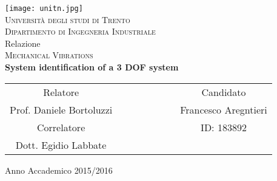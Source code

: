 \begin{titlepage}
 \begin{center}
 \texttt{[image: unitn.jpg]}\\
 \vspace{1em}
 {\Large \textsc{Università degli studi di Trento}}\\
 \vspace{1em}
 {\Large \textsc{Dipartimento di Ingegneria Industriale}}\\
 \vspace{4em}
 {\normalsize Relazione}\\
 \vspace{1em}
 {\Large \textsc{Mechanical Vibrations}}\\
 \vspace{4em}
 {\LARGE\textbf{
 	System identification of a 3 DOF system
 }}\\
 \end{center}

\vskip 2.0cm
 \begin{center}
 \begin{tabular}{c c c c c c c c}
 Relatore & & & & & & & Candidato \\[0.2cm]
 \large{Prof. Daniele Bortoluzzi} & & & & & & & \large{Francesco Aregntieri}\\[0.4cm]
 Correlatore & & & & & & & ID: 183892\\[0.2cm]
 \large{Dott. Egidio Labbate}& & & & & & &\\
 \end{tabular}
 \end{center}

\vskip 1.5cm
\begin{center}
{\normalsize Anno Accademico 2015/2016}
\end{center}
\end{titlepage}

\clearpage{\pagestyle{empty}\cleardoublepage}
